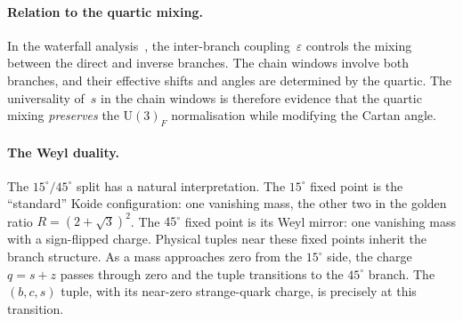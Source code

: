 \documentclass[preprint,12pt]{elsarticle}
\newcommand{\UU}{\mathrm{U}}
\begin{document}
\paragraph{Relation to the quartic mixing.}
In the waterfall analysis~\cite{waterfall}, the inter-branch
coupling~$\varepsilon$ controls the mixing between the
direct and inverse branches.  The chain windows involve
both branches, and their effective shifts and angles are determined
by the quartic.  The universality of~$s$ in the chain
windows is therefore evidence that the quartic mixing
\emph{preserves} the $\UU(3)_F$ normalisation while
modifying the Cartan angle.

\paragraph{The Weyl duality.}
The $15^\circ/45^\circ$ split has a natural interpretation.
The $15^\circ$ fixed point is the ``standard'' Koide
configuration: one vanishing mass, the other two in the
golden ratio $R = (2+\sqrt{3})^2$.  The $45^\circ$ fixed
point is its Weyl mirror: one vanishing mass with a sign-flipped
charge.  Physical tuples near these fixed points
inherit the branch structure.  As a mass approaches zero
from the $15^\circ$ side, the charge $q = s + z$
passes through zero and the tuple transitions to
the $45^\circ$ branch.  The $(b,c,s)$ tuple, with its
near-zero strange-quark charge, is precisely at this
transition.
\end{document}
